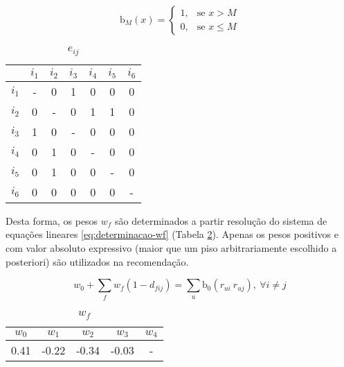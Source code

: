 \begin{equation}
\label{eq:b0}
\mathrm{b}_M\left(x\right) = 
\begin{cases}
1, &\text{se }x>M \\
0, &\text{se }x\leq M
\end{cases} 
\end{equation}

\begin{table}[p]
\begin{center}
    \caption{$e_{ij}$}
    \label{tab:eij}
    \begin{tabular}{ | c | c | c | c | c | c | c | } 
    \hline
     & $i_1$ & $i_2$ & $i_3$ & $i_4$ & $i_5$ & $i_6$  \\ \hline
     $i_1$ & - & 0 & 1 & 0 & 0 & 0 \\ \hline
     $i_2$ & 0 & - & 0 & 1 & 1 & 0  \\ \hline
     $i_3$ & 1 & 0 & - & 0 & 0 & 0 \\ \hline
     $i_4$ & 0 & 1 & 0 & - & 0 & 0 \\ \hline
     $i_5$ & 0 & 1 & 0 & 0 & - & 0 \\ \hline
     $i_6$ & 0 & 0 & 0 & 0 & 0 & - \\ \hline
    \end{tabular}
\end{center}
\end{table}

Desta forma, os pesos $w_f$ são determinados a partir resolução do sistema de equações lineares \ref{eq:determinacao-wf} (Tabela \ref{tab:w_f}). Apenas os pesos positivos e com valor absoluto expressivo (maior que um piso arbitrariamente escolhido a posteriori) são utilizados na recomendação. 

\begin{equation}
\label{eq:determinacao-wf} 
    w_0 + \sum_{f}{w_{f}  \left(1-d_{fij}\right)} = \sum_{u}{\mathrm{b_0}\left(r_{ui} ~ r_{uj}\right)},~\forall i \neq j 
\end{equation} 

\begin{table}[p]
\begin{center}
    \caption{$w_f$}
    \label{tab:w_f}
    \begin{tabular}{ | c | c | c | c | c | } 
    \hline
     $w_0$ & $w_1$ & $w_2$ & $w_3$ & $w_4$   \\ \hline
     0.41 & -0.22 & -0.34 & -0.03 & -   \\ \hline
    \end{tabular}
\end{center}
\end{table}

